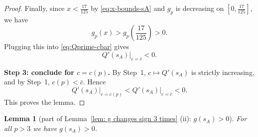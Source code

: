 \documentclass[11pt]{article}
\newtheorem{lemma}[theorem]{Lemma}
\theoremstyle{definition}
\newcommand{\1}{\mathbf{1}}
\begin{document}
\begin{proof}
\smallskip
Finally, since $x<\frac{17}{125}$ by \eqref{eq:x-bounds-sA} and $g_p$ is decreasing on $[0,\frac{17}{125}]$,
we have
\[
g_p(x)>g_p\!\left(\frac{17}{125}\right)>0.
\]
Plugging this into \eqref{eq:Qprime-cbar} gives
\[
Q'(s_A)\big|_{c=\bar c}<0.
\]

\medskip
\noindent\textbf{Step 3: conclude for $c=c(p)$.}
By Step~1, $c\mapsto Q'(s_A)$ is strictly increasing, and by Step~1, $c(p)<\bar c$.
Hence
\[
Q'(s_A)\big|_{c=c(p)}<Q'(s_A)\big|_{c=\bar c}<0.
\]
This proves the lemma.
\end{proof}




\begin{lemma}[part of Lemma~\ref{lem: g changes sign 3 times} (ii): $g(s_{A})>0$]
    For all $p>3$ we have $g(s_{A})>0$.
\end{lemma}
\end{document}
